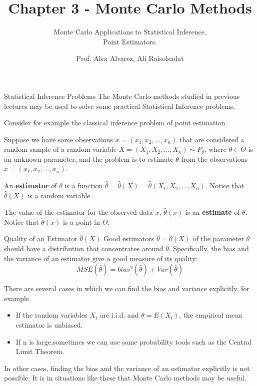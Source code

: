 \documentclass[8pt]{beamer}
\title{Chapter 3 - Monte Carlo Methods}
\subtitle{Monte Carlo Applications to Statistical Inference.\\ Point Estimators.}
\author{Prof. Alex Alvarez, Ali Raisolsadat}
\institute{School of Mathematical and Computational Sciences \\ University of Prince Edward Island}
\date{} %
\begin{document}
\maketitle

\begin{frame}{Statistical Inference Problems}
The Monte Carlo methods studied in previous lectures may be used to solve some practical Statistical Inference problems.

\vspace{2mm}

Consider for example the classical inference problem of point estimation.

\vspace{2mm}

Suppose we have some observations $x=(x_1,x_2,...,x_n)$ that are considered a random sample of a random variable $X=(X_1,X_2,...,X_n)\sim P_{\theta}$, where $\theta \in \Theta$ is an unknown parameter,
and the problem is to estimate  $\theta$ from the observations $x=(x_1,x_2,...,x_n)$.

\vspace{2mm}

An \textbf{estimator} of $\theta$ is a function $\hat{\theta}=\hat{\theta}(X)=\hat{\theta}(X_1,X_2,...,X_n)$. Notice that $\hat{\theta}(X)$ is a random variable.
\vspace{2mm}

The value of the estimator for the observed data $x$, $\hat{\theta}(x)$ is an {\bf estimate} of $\theta$. Notice that $\hat{\theta}(x)$ is a point in $\Theta$.
\end{frame}

\begin{frame}{Quality of an Estimator $\hat{\theta}(X)$}
Good estimators $\hat{\theta}=\hat{\theta}(X)$ of the parameter $\theta$ should have a distribution that concentrates around $\theta$.
Specifically, the bias and the variance of an estimator give a good measure of its quality:
\begin{equation*}
	MSE (\hat{\theta}) = bias^2(\hat{\theta}) + Var(\hat{\theta})
\end{equation*}

There are several cases in which we can find the bias and variance explicitly, for example

\begin{itemize}
	\item If the random variables $X_i$ are i.i.d. and $\theta=E(X_i)$, the empirical mean estimator is unbiased.
	\item If n is large,sometimes we can use some probability tools such as the Central Limit Theorem.
\end{itemize}

In other cases, finding the bias and the variance of an estimator explicitly is not possible. It is in situations like these that Monte Carlo methods may be useful.
\end{frame}
\end{document}

